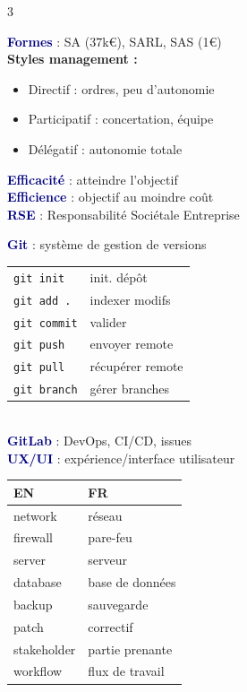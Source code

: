 \documentclass[a4paper,9pt]{article}
\newcommand{\key}[1]{\textbf{\textcolor{navy}{#1}}}
\begin{document}
\begin{multicols}{3}
\begin{tcolorbox}[basebox, colframe=teal, title=CEJM — Management]
\key{Formes} : SA (37k€), SARL, SAS (1€) \\
\textbf{Styles management :}
\begin{itemize}
  \item Directif : ordres, peu d'autonomie
  \item Participatif : concertation, équipe
  \item Délégatif : autonomie totale
\end{itemize}
\key{Efficacité} : atteindre l'objectif \\
\key{Efficience} : objectif au moindre coût \\
\key{RSE} : Responsabilité Sociétale Entreprise
\end{tcolorbox}

\begin{tcolorbox}[basebox, colframe=green, title=GIT \& OUTILS]
\key{Git} : système de gestion de versions \\[1pt]
{\footnotesize
\begin{tabularx}{\columnwidth}{@{}lX@{}}
\texttt{git init} & init. dépôt \\
\texttt{git add .} & indexer modifs \\
\texttt{git commit} & valider \\
\texttt{git push} & envoyer remote \\
\texttt{git pull} & récupérer remote \\
\texttt{git branch} & gérer branches \\
\end{tabularx}}
\vspace{1pt}\\
\key{GitLab} : DevOps, CI/CD, issues \\
\key{UX/UI} : expérience/interface utilisateur
\end{tcolorbox}

\begin{tcolorbox}[basebox, colframe=green, title=ANGLAIS — Vocabulaire IT]
{\footnotesize
\begin{tabularx}{\columnwidth}{@{}lX@{}}
\textbf{EN} & \textbf{FR} \\
\hline
network & réseau \\
firewall & pare-feu \\
server & serveur \\
database & base de données \\
backup & sauvegarde \\
patch & correctif \\
stakeholder & partie prenante \\
workflow & flux de travail \\
\end{tabularx}}
\end{tcolorbox}

\end{multicols}
\end{document}
